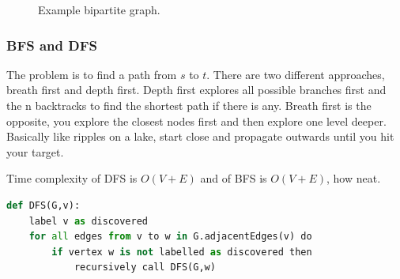 \documentclass[12pt]{article} %
\begin{document}
\begin{figure}[H]
\caption{Example bipartite graph.}
\label{exBiGraph}
\end{figure}

\subsubsection{BFS and DFS}
The problem is to find a path from $s$ to $t$. There are two different approaches, breath first and depth first. Depth first explores all possible branches first and the n backtracks to find the shortest path if there is any. Breath first is the opposite, you explore the closest nodes first and then explore one level deeper. Basically like ripples on a lake, start close and propagate outwards until you hit your target.

\par Time complexity of DFS is $O(V + E)$ and of BFS is $O(V + E)$, how neat.

\begin{lstlisting}[language=Python, caption=Recursive DFS in Python]
def DFS(G,v):
    label v as discovered
    for all edges from v to w in G.adjacentEdges(v) do
        if vertex w is not labelled as discovered then
            recursively call DFS(G,w)
\end{lstlisting}
\end{document}
